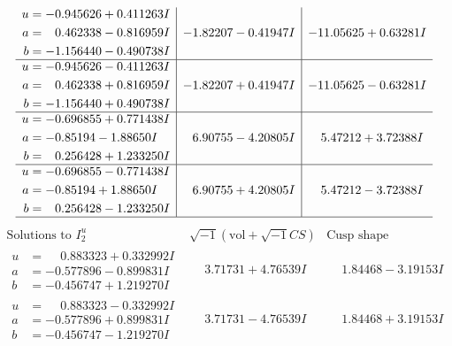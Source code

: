 \documentclass[1p]{elsarticle_modified}
\theoremstyle{definition}
\newcommand{\I}{\sqrt{-1}}
\begin{document}
$$\begin{array}{c|c|c}
\begin{aligned}
u &= -0.945626 + 0.411263 I \\
a &= \phantom{-}0.462338 - 0.816959 I \\
b &= -1.156440 - 0.490738 I\end{aligned}
 & -1.82207 - 0.41947 I & -11.05625 + 0.63281 I \\ \hline\begin{aligned}
u &= -0.945626 - 0.411263 I \\
a &= \phantom{-}0.462338 + 0.816959 I \\
b &= -1.156440 + 0.490738 I\end{aligned}
 & -1.82207 + 0.41947 I & -11.05625 - 0.63281 I \\ \hline\begin{aligned}
u &= -0.696855 + 0.771438 I \\
a &= -0.85194 - 1.88650 I \\
b &= \phantom{-}0.256428 + 1.233250 I\end{aligned}
 & \phantom{-}6.90755 - 4.20805 I & \phantom{-}5.47212 + 3.72388 I \\ \hline\begin{aligned}
u &= -0.696855 - 0.771438 I \\
a &= -0.85194 + 1.88650 I \\
b &= \phantom{-}0.256428 - 1.233250 I\end{aligned}
 & \phantom{-}6.90755 + 4.20805 I & \phantom{-}5.47212 - 3.72388 I\\
 \hline 
 \end{array}$$\newpage$$\begin{array}{c|c|c}  
\text{Solutions to }I^u_{2}& \I (\text{vol} + \sqrt{-1}CS) & \text{Cusp shape}\\
 \hline 
\begin{aligned}
u &= \phantom{-}0.883323 + 0.332992 I \\
a &= -0.577896 - 0.899831 I \\
b &= -0.456747 + 1.219270 I\end{aligned}
 & \phantom{-}3.71731 + 4.76539 I & \phantom{-}1.84468 - 3.19153 I \\ \hline\begin{aligned}
u &= \phantom{-}0.883323 - 0.332992 I \\
a &= -0.577896 + 0.899831 I \\
b &= -0.456747 - 1.219270 I\end{aligned}
 & \phantom{-}3.71731 - 4.76539 I & \phantom{-}1.84468 + 3.19153 I \\ \hline\begin{aligned}

\end{aligned}
\end{array}$$
\end{document}
